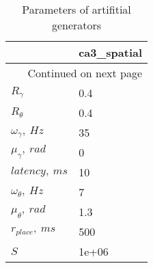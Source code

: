 \begin{longtable}{ll}
\caption{Parameters of artifitial generators}\label{ArtifitialPlaceCell_parameters}\\
\toprule
{} & ca3\_spatial \\
\midrule
\endhead
\midrule
\multicolumn{2}{r}{{Continued on next page}} \\
\midrule
\endfoot

\bottomrule
\endlastfoot
$R_{\gamma}$         &         0.4 \\
$R_{\theta}$         &         0.4 \\
$\omega_{\gamma},\ Hz$     &          35 \\
$\mu_{\gamma},\ rad$        &           0 \\
$latency,\ ms$        &          10 \\
$\omega_{\theta},\ Hz$      &           7 \\
$\mu_{\theta},\ rad$         &         1.3 \\
$r_{place}, \ ms$ &         500 \\
$S$     &       1e+06 \\
\end{longtable}
